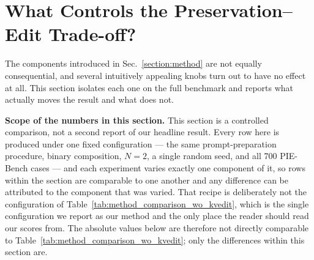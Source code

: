 
\section{What Controls the Preservation--Edit Trade-off?}
\label{sec:analysis}

The components introduced in Sec.~\ref{section:method} are not equally
consequential, and several intuitively appealing knobs turn out to have no
effect at all. This section isolates each one on the full benchmark and reports
what actually moves the result and what does not.

\noindent\textbf{Scope of the numbers in this section.}
This section is a controlled comparison, not a second report of our headline
result. Every row here is produced under one fixed configuration --- the same
prompt-preparation procedure, binary composition, $N{=}2$, a single random seed,
and all 700 PIE-Bench cases --- and each experiment varies exactly one component
of it, so rows within the section
are comparable to one another and any difference can be attributed to the
component that was varied. That recipe is deliberately not the configuration of
Table~\ref{tab:method_comparison_wo_kvedit}, which is the single configuration we
report as our method and the only place the reader should read our scores from.
The absolute values below are therefore not directly comparable to
Table~\ref{tab:method_comparison_wo_kvedit}; only the differences within this
section are.

